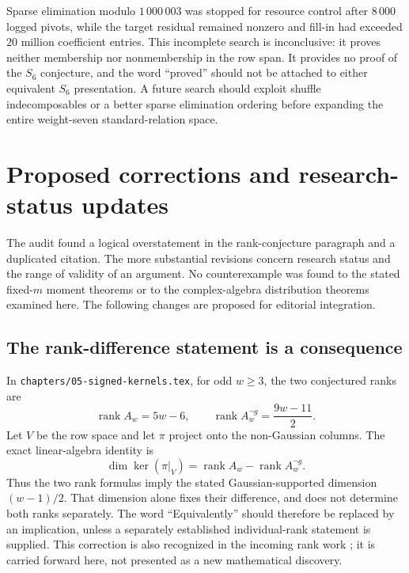 \documentclass[11pt,a4paper]{article}
\numberwithin{equation}{section}
\theoremstyle{plain}
\theoremstyle{definition}
\theoremstyle{remark}
\newcommand{\src}[1]{\nolinkurl{#1}}
\begin{document}
Sparse elimination modulo $1\,000\,003$ was stopped for resource control
after $8\,000$ logged pivots, while the target residual remained
nonzero and fill-in had exceeded $20$ million coefficient entries.
This incomplete search is inconclusive: it proves neither membership
nor nonmembership in the row span. It provides no proof of the $S_6$
conjecture, and the word ``proved'' should not be attached to either
equivalent $S_6$ presentation. A future search should exploit shuffle
indecomposables or a better sparse elimination ordering before expanding
the entire weight-seven standard-relation space.


\section{Proposed corrections and research-status updates}
\label{cont:sec:editorial}

The audit found a logical overstatement in the rank-conjecture
paragraph and a duplicated citation. The more substantial revisions
concern research status and the range of validity of an argument.
No counterexample was found to the stated fixed-$m$ moment theorems
or to the complex-algebra distribution theorems examined here.
The following changes are proposed for editorial integration.

\subsection{The rank-difference statement is a consequence}

In \src{chapters/05-signed-kernels.tex}, for odd $w\ge3$, the two
conjectured ranks are
\[
 \operatorname{rank}A_w=5w-6,\qquad
 \operatorname{rank}A_w^{\neg g}=\frac{9w-11}{2}.
\]
Let $V$ be the row space and let $\pi$ project onto the
non-Gaussian columns. The exact linear-algebra identity is
\begin{equation}\label{cont:eq:rank-difference}
 \dim\ker(\pi|_V)
  =\operatorname{rank}A_w-\operatorname{rank}A_w^{\neg g}.
\end{equation}
Thus the two rank formulas imply the stated Gaussian-supported
dimension $(w-1)/2$. That dimension alone fixes their difference,
and does not determine both ranks separately. The word
``Equivalently'' should therefore be replaced by an implication,
unless a separately established individual-rank statement is supplied.
This correction is also recognized in the incoming rank work
\cite{cont:RankIncoming,cont:FormalIncoming}; it is carried forward
here, not presented as a new mathematical discovery.
\end{document}
